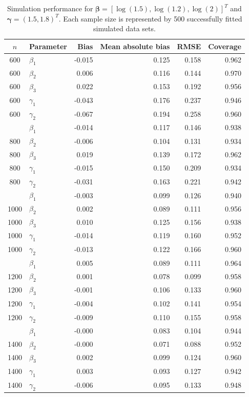 \begin{table}[!htbp]
\caption[Fixed-parameter simulation performance by sample size]{Simulation
performance for
$\boldsymbol\beta=[\log(1.5),\log(1.2),\log(2)]^{T}$ and
$\boldsymbol\gamma=(1.5,1.8)^{T}$. Each sample size is represented by 500
successfully fitted simulated data sets.}
\label{tab:fixedParameterSummary}
\centering
\scriptsize
\begin{tabular}{clrrrr}
\toprule
$n$ & Parameter & Bias & Mean absolute bias & RMSE & Coverage \\
\midrule
600 & $\beta_1$  & -0.015 & 0.125 & 0.158 & 0.962 \\
600 & $\beta_2$  &  0.006 & 0.116 & 0.144 & 0.970 \\
600 & $\beta_3$  &  0.022 & 0.153 & 0.192 & 0.956 \\
600 & $\gamma_1$ & -0.043 & 0.176 & 0.237 & 0.946 \\
600 & $\gamma_2$ & -0.067 & 0.194 & 0.258 & 0.960 \\
\addlinespace
800 & $\beta_1$  & -0.014 & 0.117 & 0.146 & 0.938 \\
800 & $\beta_2$  & -0.006 & 0.104 & 0.131 & 0.934 \\
800 & $\beta_3$  &  0.019 & 0.139 & 0.172 & 0.962 \\
800 & $\gamma_1$ & -0.015 & 0.150 & 0.209 & 0.934 \\
800 & $\gamma_2$ & -0.031 & 0.163 & 0.221 & 0.942 \\
\addlinespace
1000 & $\beta_1$  & -0.003 & 0.099 & 0.126 & 0.940 \\
1000 & $\beta_2$  &  0.002 & 0.089 & 0.111 & 0.956 \\
1000 & $\beta_3$  &  0.010 & 0.125 & 0.156 & 0.938 \\
1000 & $\gamma_1$ & -0.014 & 0.119 & 0.160 & 0.952 \\
1000 & $\gamma_2$ & -0.013 & 0.122 & 0.166 & 0.960 \\
\addlinespace
1200 & $\beta_1$  &  0.005 & 0.089 & 0.111 & 0.964 \\
1200 & $\beta_2$  &  0.001 & 0.078 & 0.099 & 0.958 \\
1200 & $\beta_3$  & -0.001 & 0.106 & 0.133 & 0.960 \\
1200 & $\gamma_1$ & -0.004 & 0.102 & 0.141 & 0.954 \\
1200 & $\gamma_2$ & -0.009 & 0.110 & 0.155 & 0.958 \\
\addlinespace
1400 & $\beta_1$  & -0.000 & 0.083 & 0.104 & 0.944 \\
1400 & $\beta_2$  & -0.000 & 0.071 & 0.088 & 0.952 \\
1400 & $\beta_3$  &  0.002 & 0.099 & 0.124 & 0.960 \\
1400 & $\gamma_1$ &  0.003 & 0.093 & 0.127 & 0.942 \\
1400 & $\gamma_2$ & -0.006 & 0.095 & 0.133 & 0.948 \\
\bottomrule
\end{tabular}
\end{table}

